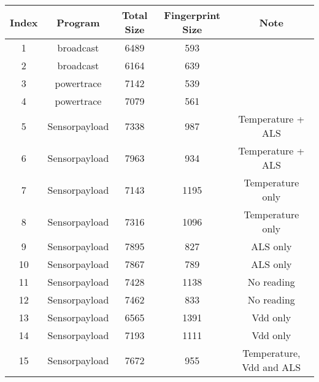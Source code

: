 \begin{table}[!ht]
\center
\begin{tabular}{|c|c|c|c|c|}
\hline
\textbf{Index} & \textbf{Program} & \textbf{Total Size} & \textbf{Fingerprint Size} & \textbf{Note}              \\ \hline
1                    & broadcast            & 6489          & 593                    &                            \\ \hline
2                    & broadcast            & 6164          & 639                    &                            \\ \hline
3                    & powertrace           & 7142          & 539                    &                            \\ \hline
4                    & powertrace           & 7079          & 561                    &                            \\ \hline
5                    & Sensorpayload        & 7338          & 987                    & Temperature + ALS        \\ \hline
6                    & Sensorpayload        & 7963          & 934                    & Temperature + ALS        \\ \hline
7                    & Sensorpayload        & 7143          & 1195                   & Temperature only           \\ \hline
8                    & Sensorpayload        & 7316          & 1096                   & Temperature only           \\ \hline
9                    & Sensorpayload        & 7895          & 827                    & ALS only                 \\ \hline
10                   & Sensorpayload        & 7867          & 789                    & ALS only                 \\ \hline
11                   & Sensorpayload        & 7428          & 1138                   & No reading                 \\ \hline
12                   & Sensorpayload        & 7462          & 833                    & No reading                 \\ \hline
13                   & Sensorpayload        & 6565          & 1391                   & Vdd only                   \\ \hline
14                   & Sensorpayload        & 7193          & 1111                   & Vdd only                   \\ \hline
15                   & Sensorpayload        & 7672          & 955                    & Temperature, Vdd and ALS \\ \hline

\end{tabular}
\end{table}
